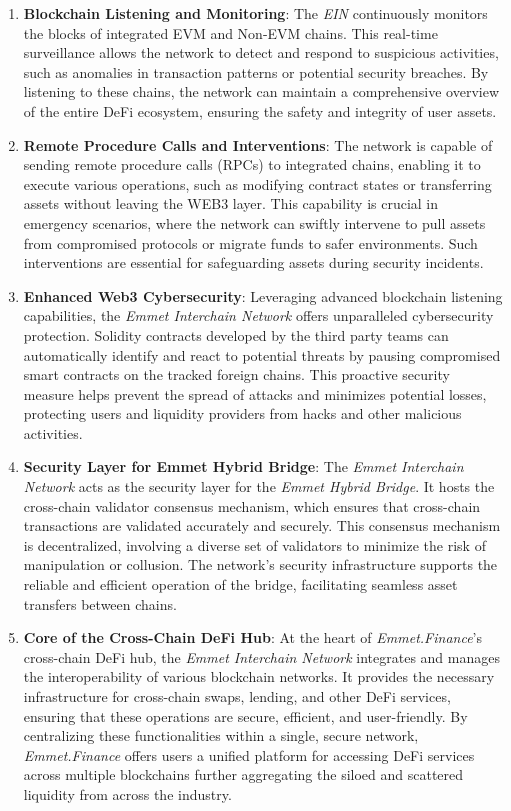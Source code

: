 \documentclass[12pt, a4paper]{article}
\begin{document}
\begin{enumerate}
    \item \textbf{Blockchain Listening and Monitoring}: The \textit{EIN} continuously monitors the blocks of integrated EVM and Non-EVM chains. This real-time surveillance allows the network to detect and respond to suspicious activities, such as anomalies in transaction patterns or potential security breaches. By listening to these chains, the network can maintain a comprehensive overview of the entire DeFi ecosystem, ensuring the safety and integrity of user assets.
    \item \textbf{Remote Procedure Calls and Interventions}: The network is capable of sending remote procedure calls (RPCs) to integrated chains, enabling it to execute various operations, such as modifying contract states or transferring assets without leaving the WEB3 layer. This capability is crucial in emergency scenarios, where the network can swiftly intervene to pull assets from compromised protocols or migrate funds to safer environments. Such interventions are essential for safeguarding assets during security incidents.
    \item \textbf{Enhanced Web3 Cybersecurity}: Leveraging advanced blockchain listening capabilities, the \textit{Emmet Interchain Network} offers unparalleled cybersecurity protection. Solidity contracts developed by the third party teams can automatically identify and react to potential threats by pausing compromised smart contracts on the tracked foreign chains. This proactive security measure helps prevent the spread of attacks and minimizes potential losses, protecting users and liquidity providers from hacks and other malicious activities.
    \item \textbf{Security Layer for Emmet Hybrid Bridge}: The \textit{Emmet Interchain Network} acts as the security layer for the \textit{Emmet Hybrid Bridge}. It hosts the cross-chain validator consensus mechanism, which ensures that cross-chain transactions are validated accurately and securely. This consensus mechanism is decentralized, involving a diverse set of validators to minimize the risk of manipulation or collusion. The network's security infrastructure supports the reliable and efficient operation of the bridge, facilitating seamless asset transfers between chains.
    \item \textbf{Core of the Cross-Chain DeFi Hub}: At the heart of \textit{Emmet.Finance}'s cross-chain DeFi hub, the \textit{Emmet Interchain Network} integrates and manages the interoperability of various blockchain networks. It provides the necessary infrastructure for cross-chain swaps, lending, and other DeFi services, ensuring that these operations are secure, efficient, and user-friendly. By centralizing these functionalities within a single, secure network, \textit{Emmet.Finance} offers users a unified platform for accessing DeFi services across multiple blockchains further aggregating the siloed and scattered liquidity from across the industry.
\end{enumerate}
\end{document}
